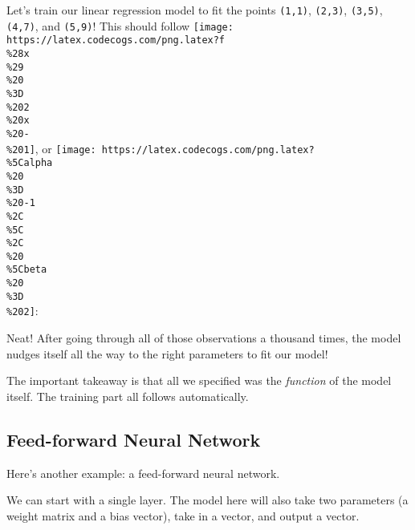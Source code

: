 \documentclass[]{article}
\newenvironment{Shaded}{}{}
\newcommand{\CommentTok}[1]{\textcolor[rgb]{0.38,0.63,0.69}{\textit{#1}}}
\newcommand{\DecValTok}[1]{\textcolor[rgb]{0.25,0.63,0.44}{#1}}
\newcommand{\FloatTok}[1]{\textcolor[rgb]{0.25,0.63,0.44}{#1}}
\newcommand{\FunctionTok}[1]{\textcolor[rgb]{0.02,0.16,0.49}{#1}}
\newcommand{\NormalTok}[1]{#1}
\begin{document}
Let's train our linear regression model to fit the points \texttt{(1,1)},
\texttt{(2,3)}, \texttt{(3,5)}, \texttt{(4,7)}, and \texttt{(5,9)}! This should
follow
\texttt{[image: https://latex.codecogs.com/png.latex?f\\\%28x\\\%29\\\%20\\\%3D\\\%202\\\%20x\\\%20-\\\%201]},
or
\texttt{[image: https://latex.codecogs.com/png.latex?\\\%5Calpha\\\%20\\\%3D\\\%20-1\\\%2C\\\%5C\\\%2C\\\%20\\\%5Cbeta\\\%20\\\%3D\\\%202]}:

\begin{Shaded}
\end{Shaded}

Neat! After going through all of those observations a thousand times, the model
nudges itself all the way to the right parameters to fit our model!

The important takeaway is that all we specified was the \emph{function} of the
model itself. The training part all follows automatically.

\hypertarget{feed-forward-neural-network}{%
\subsection{Feed-forward Neural Network}\label{feed-forward-neural-network}}

Here's another example: a feed-forward neural network.

We can start with a single layer. The model here will also take two parameters
(a weight matrix and a bias vector), take in a vector, and output a vector.
\end{document}
